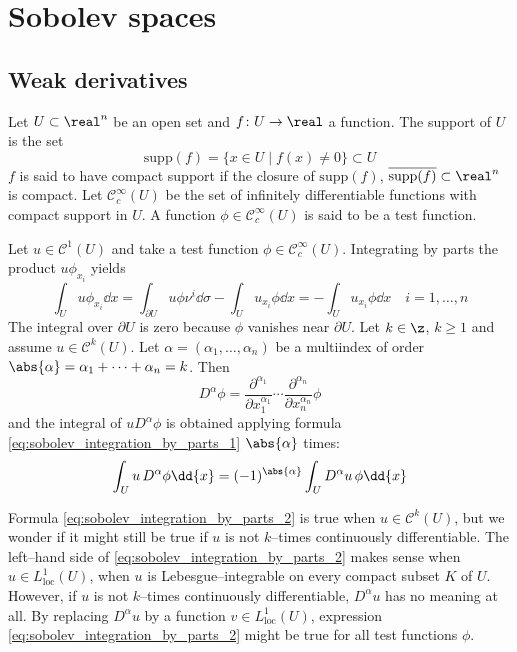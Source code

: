 
\section{Sobolev spaces}

\subsection{Weak derivatives}

Let $U \subset \real^n$ be an open set and $f \colon U \rightarrow \real$ a
function. The support of $U$ is the set
\[
    \mathrm{supp}(f) = \{ x \in U \mid f(x) \neq 0 \} \subset U
\]
$f$ is said to have compact support if the closure of $\mathrm{supp}(f)$,
$\overline{\mathrm{supp}(f)} \subset \real^n$ is compact. Let
$\mathcal{C}_c^\infty(U)$ be the set of infinitely differentiable functions with
compact support in $U$. A function $\phi \in \mathcal{C}_c^\infty(U)$ is said to
be a test function. 

Let $u \in \mathcal{C}^1(U)$ and take a test function $\phi \in
\mathcal{C}_c^\infty(U)$. Integrating by parts the product $u \phi_{x_i}$ yields
\begin{equation} \label{eq:sobolev_integration_by_parts_1}
    \int_U u \phi_{x_i} \dd{x} = 
    \int_{\partial U} u \phi \nu^i \dd{\sigma} - \int_U u_{x_i} \phi \dd{x} = 
    - \int_U u_{x_i} \phi \dd{x} \quad i = 1, \ldots, n
\end{equation}
The integral over $\partial U$ is zero because $\phi$ vanishes near $\partial
U$. Let $k \in \z$, $k \geq 1$ and assume $u \in \mathcal{C}^k(U)$. Let $\alpha
= (\alpha_1, \ldots, \alpha_n)$ be a multiindex of order $\abs{\alpha} =
\alpha_1 + \cdots + \alpha_n = k$. Then
\[
    D^\alpha \phi = 
    \frac{\partial^{\alpha_1}}{\partial x_1^{\alpha_1}} \cdots 
    \frac{\partial^{\alpha_n}}{\partial x_n^{\alpha_n}} \phi
\]
and the integral of $u D^\alpha \phi$ is obtained applying formula
\eqref{eq:sobolev_integration_by_parts_1} $\abs{\alpha}$ times:
\begin{equation} \label{eq:sobolev_integration_by_parts_2}
    \int_U u \, D^\alpha \phi \dd{x} = 
    (-1)^{\abs{\alpha}} \int_U D^\alpha u \, \phi \dd{x}
\end{equation}

Formula \eqref{eq:sobolev_integration_by_parts_2} is true when $u \in
\mathcal{C}^k(U)$, but we wonder if it might still be true if $u$ is not
$k$--times continuously differentiable. The left--hand side of
\eqref{eq:sobolev_integration_by_parts_2} makes sense when $u \in
L_\text{loc}^1(U)$, \ie when $u$ is Lebesgue--integrable on every compact subset
$K$ of $U$. However, if $u$ is not $k$--times continuously differentiable,
$D^\alpha u$ has no meaning at all. By replacing $D^\alpha u$ by a function $v
\in L_\text{loc}^1(U)$, expression \eqref{eq:sobolev_integration_by_parts_2}
might be true for all test functions $\phi$.

